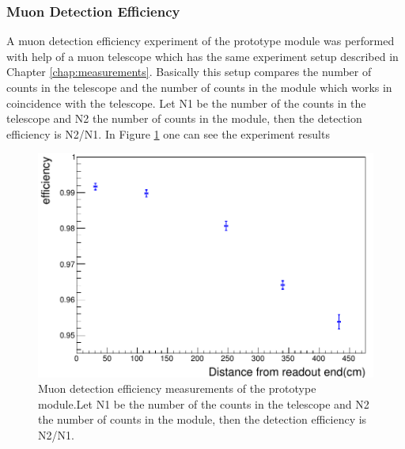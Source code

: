 \documentclass[a4paper]{article}\linespread{1.4}
\begin{document}
\subsubsection{Muon Detection Efficiency}
A muon detection efficiency experiment of the prototype module was performed with help of a muon telescope which has the same experiment setup described in Chapter \ref{chap:measurements}. Basically this setup compares the number of counts in the telescope and the number of counts in the module which works in coincidence with the telescope. Let N1 be the number of the counts in the telescope and N2 the number of counts in the module,  then the detection efficiency is N2/N1.
In Figure \ref{fig:eff} one can see the experiment results \begin{figure}[h!] \centering \includegraphics[width=120mm,scale=1.0]{figures/eff.png} \caption{Muon detection efficiency measurements of the prototype module.Let N1 be the number of the counts in the telescope and N2 the number of counts in the module,  then the detection efficiency is N2/N1. \cite{E}} \label{fig:eff}\end{figure} 
\end{document}
